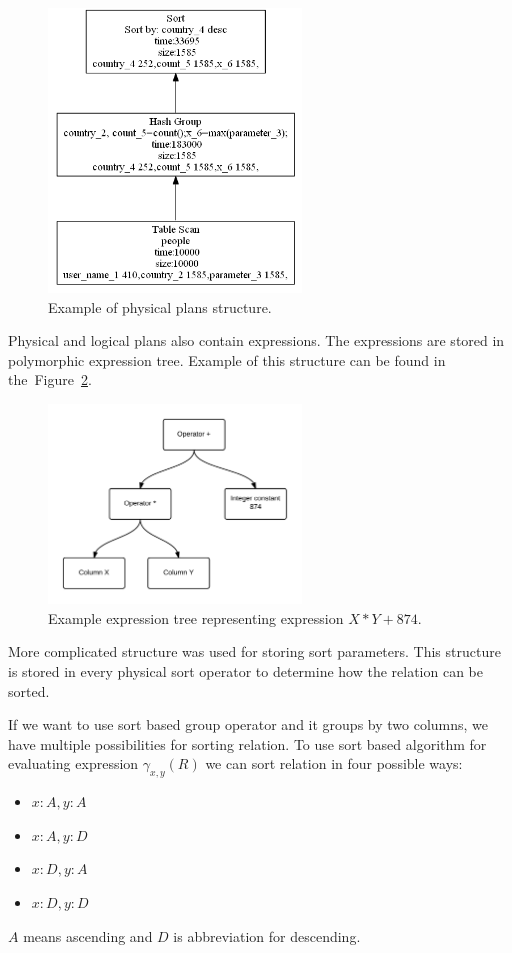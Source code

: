 \begin{figure}[h!]
  \centering
    \includegraphics[width=0.6\textwidth]{groupplan}

      \caption{Example of physical plans structure.}
          \label{fig:groupplan}
\end{figure}

Physical and logical plans also contain expressions. The expressions are stored in polymorphic expression tree. Example of this structure can be found in the~Figure~\ref*{fig:expressiontree}.
\begin{figure}[h!]
  \centering
    \includegraphics[width=0.6\textwidth]{expressiontree}

      \caption{Example expression tree representing expression  $X*Y+874$.}
          \label{fig:expressiontree}
\end{figure}

More complicated structure was used for storing sort parameters. This structure is stored in every physical sort operator to determine how the relation can be sorted. 

If we want to use sort based group operator and it groups by two columns, we have multiple possibilities for sorting relation. To use sort based algorithm for evaluating expression $\gamma_{x,y}(R)$ we can sort relation in four possible ways:
\begin{itemize}
\item $x:A,y:A$
\item $x:A,y:D$
\item $x:D,y:A$
\item $x:D,y:D$
\end{itemize}
$A$ means ascending and $D$ is abbreviation for descending.

